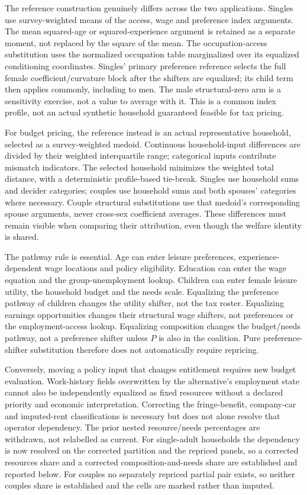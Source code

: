 \documentclass[11pt,a4paper]{article}
\begin{document}
The reference construction genuinely differs across the two applications. Singles use survey-weighted means of the access, wage and preference index arguments. The mean squared-age or squared-experience argument is retained as a separate moment, not replaced by the square of the mean. The occupation-access substitution uses the normalized occupation table marginalized over its equalized conditioning coordinates. Singles' primary preference reference selects the full female coefficient/curvature block after the shifters are equalized; its child term then applies commonly, including to men. The male structural-zero arm is a sensitivity exercise, not a value to average with it. This is a common index profile, not an actual synthetic household guaranteed feasible for tax pricing.

For budget pricing, the reference instead is an actual representative household, selected as a survey-weighted medoid. Continuous household-input differences are divided by their weighted interquartile range; categorical inputs contribute mismatch indicators. The selected household minimizes the weighted total distance, with a deterministic profile-based tie-break. Singles use household sums and decider categories; couples use household sums and both spouses' categories where necessary. Couple structural substitutions use that medoid's corresponding spouse arguments, never cross-sex coefficient averages. These differences must remain visible when comparing their attribution, even though the welfare identity is shared.

The pathway rule is essential. Age can enter leisure preferences, experience-dependent wage locations and policy eligibility. Education can enter the wage equation and the group-unemployment lookup. Children can enter female leisure utility, the household budget and the needs scale. Equalizing the preference pathway of children changes the utility shifter, not the tax roster. Equalizing earnings opportunities changes their structural wage shifters, not preferences or the employment-access lookup. Equalizing composition changes the budget/needs pathway, not a preference shifter unless \(P\) is also in the coalition. Pure preference-shifter substitution therefore does not automatically require repricing.

Conversely, moving a policy input that changes entitlement requires new budget evaluation. Work-history fields overwritten by the alternative's employment state cannot also be independently equalized as fixed resources without a declared priority and economic interpretation. Correcting the fringe-benefit, company-car and imputed-rent classifications is necessary but does not alone resolve that operator dependency. The prior nested resource/needs percentages are withdrawn, not relabelled as current. For single-adult households the dependency is now resolved on the corrected partition and the repriced panels, so a corrected resources share and a corrected composition-and-needs share are established and reported below. For couples no separately repriced partial pair exists, so neither couples share is established and the cells are marked rather than imputed.
\end{document}
